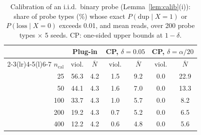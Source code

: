 \begin{table}[!htbp]
\centering
\caption{Calibration of an i.i.d.\ binary probe (Lemma~\ref{lem:calib}(i)): share of probe types (\%) whose exact $P(\mathrm{dup}\mid X{=}1)$ or $P(\mathrm{loss}\mid X{=}0)$ exceeds 0.01, and mean reads, over 200 probe types $\times$ 5 seeds. CP: one-sided upper bounds at $1{-}\delta$.}
\label{tab:calib}
\footnotesize
\setlength{\tabcolsep}{3.5pt}
\begin{tabular}{@{}r cc cc cc@{}}
\toprule
 & \multicolumn{2}{c}{Plug-in} & \multicolumn{2}{c}{CP, $\delta{=}0.05$} & \multicolumn{2}{c}{CP, $\delta{=}\alpha/20$} \\
\cmidrule(lr){2-3}\cmidrule(lr){4-5}\cmidrule(l){6-7}
$n_{\mathrm{cal}}$ & viol. & $\bar N$ & viol. & $\bar N$ & viol. & $\bar N$ \\
\midrule
25 & 56.3 & 4.2 & 1.5 & 9.2 & 0.0 & 22.9 \\
50 & 44.1 & 4.3 & 1.6 & 7.0 & 0.0 & 13.3 \\
100 & 33.7 & 4.3 & 1.0 & 5.7 & 0.0 & 8.2 \\
200 & 19.2 & 4.3 & 0.7 & 5.2 & 0.0 & 6.5 \\
400 & 12.2 & 4.2 & 0.6 & 4.8 & 0.0 & 5.6 \\
\bottomrule
\end{tabular}
\end{table}
